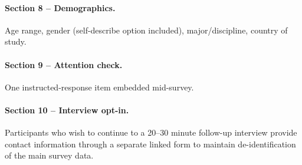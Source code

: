 \documentclass[sigconf,review,anonymous]{acmart}
\begin{document}
\paragraph{Section 8 -- Demographics.}
Age range, gender (self-describe option included), major/discipline, country of study.

\paragraph{Section 9 -- Attention check.}
One instructed-response item embedded mid-survey.

\paragraph{Section 10 -- Interview opt-in.}
Participants who wish to continue to a 20--30 minute follow-up interview provide contact information through a separate linked form to maintain de-identification of the main survey data.
\end{document}

